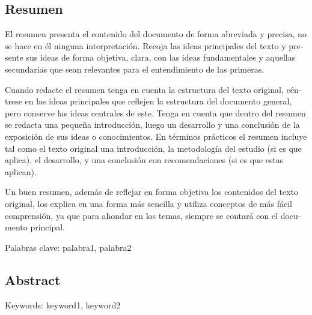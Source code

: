 \begin{otherlanguage}{spanish}
    \chapter*{Resumen}

    El resumen presenta el contenido del documento de forma abreviada y precisa,
    no se hace en él ninguna interpretación. Recoja las ideas principales del texto
    y presente sus ideas de forma objetiva, clara, con las ideas fundamentales y
    aquellas secundarias que sean relevantes para el entendimiento de las
    primeras.

    Cuando redacte el resumen tenga en cuenta la estructura del texto original,
    céntrese en las ideas principales que reflejen la estructura del documento
    general, pero conserve las ideas centrales de este. Tenga en cuenta que dentro
    del resumen se redacta una pequeña introducción, luego un desarrollo y una
    conclusión de la exposición de sus ideas o conocimientos. En términos prácticos
    el resumen incluye tal como el texto original una introducción, la metodología
    del estudio (si es que aplica), el desarrollo, y una conclusión con
    recomendaciones (si es que estas aplican).

    Un buen resumen, además de reflejar en forma objetiva los contenidos del
    texto original, los explica en una forma más sencilla y utiliza conceptos de más
    fácil comprensión, ya que para ahondar en los temas, siempre se contará con
    el documento principal.

    \vskip0.5cm

    Palabras clave: palabra1, palabra2
\end{otherlanguage}

\begin{otherlanguage}{english}
    \chapter*{Abstract}
    \lipsum[1-2]
    \vskip0.5cm
    Keywords: keyword1, keyword2
\end{otherlanguage}
